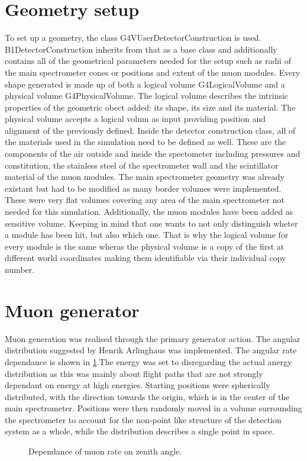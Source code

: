   \section{Geometry setup}
  \label{ch:Simulation software:sec:Geometry setup}
  To set up a geometry, the class G4VUserDetectorConstruction is used. B1DetectorConstruction inherits from that as a base class and additionally contains all of the geometrical parameters needed for the setup such as radii of the main spectrometer cones or positions and extent of the muon modules. Every shape generated is made up of both a logical volume G4LogicalVolume and a physical volume G4PhysicalVolume. The logical volume describes the intrinsic properties of the geometric obect added: its shape, its size and its material. The physical volume accepts a logical volum as input providing position and alignment of the previously defined.
  Inside the detector construction class, all of the materials used in the simulation need to be defined as well. These are the components of the air outside and inside the spectometer including pressures and constitution, the stainless steel of the spectrometer wall and the scintillator material of the muon modules.
  The main spectrometer geometry was already  existant but had to be modified as many border volumes were implemented. These were very flat volumes covering any area of the main spectrometer not needed for this simulation. Additionally, the muon modules have been added as sensitive volume. Keeping in mind that one wants to not only distinguish wheter a module has been hit, but also which one. That is why the logical volume for every module is the same wheras the physical volume is a copy of the first at different world coordinates making them identifiable via their individual copy number.
  
  \section{Muon generator}
  \label{ch:Simulation software:sec:Muon generator}
  
  Muon generation was realised through the primary generator action. The angular distribution suggested by Henrik Arlinghaus \cite{DTArlinghaus} was implemented. The angular rate dependance is shown in \ref{fig:rateDependance}.The energy was set to  disregarding the actual anergy distribution as this was mainly about flight paths that are not strongly dependant on energy at high energies. Starting positions were spherically distributed, with the direction towards the origin, which is in the center of the main spectrometer. Positions were then randomly moved in a volume surrounding the spectrometer to account for the non-point like structure of the detection system as a whole, while the distribution describes a single point in space.
  \begin{figure}
  	\caption[Muon rate dependance on zenith angle]{Dependance of muon rate on zenith angle.}
  	\label{fig:rateDependance}
  \end{figure}

